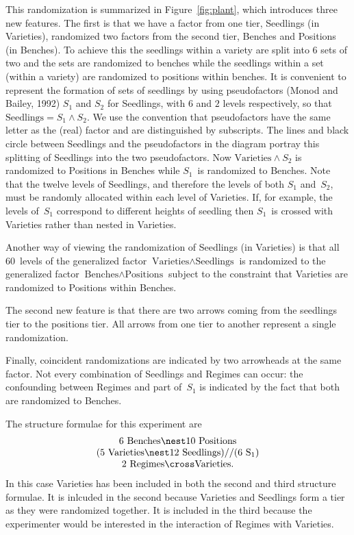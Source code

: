 This randomization is summarized in Figure~\ref{fig:plant}, which 
introduces three new features.  The first is that we have a factor from one 
tier, Seedlings (in Varieties), randomized two factors from the second tier, 
Benches and Positions (in Benches). 
To achieve this the seedlings within a variety are split into 6 sets of
two and the sets are randomized to benches while the seedlings within a set 
(within a variety) are randomized to positions within benches.
It is convenient to represent the formation of sets of seedlings by using
pseudofactors (\nocite{Monod92}Monod and Bailey, 1992) $S_1$ and $S_2$ 
for Seedlings, with $6$ and $2$ levels
respectively, so that $\mbox{Seedlings} = S_1\wedge S_2$. We use the
convention that pseudofactors have the same letter as the (real)
factor and are distinguished by subscripts. The lines and black circle between 
Seedlings and the pseudofactors in the diagram portray this splitting of 
Seedlings into the two pseudofactors. 
Now $\mbox{Varieties}
\wedge S_2$ is randomized to Positions in Benches while $S_1$~is
randomized to Benches. Note that the twelve levels of Seedlings, 
and therefore the levels of
both $S_1$ and~$S_2$, must be randomly allocated within each level of
Varieties. If, for example, the levels of~$S_1$ correspond to
different heights of seedling then $S_1$~is crossed with Varieties
rather than nested in Varieties.

Another way of viewing the randomization of Seedlings (in Varieties) 
is that all $60$~levels of the generalized factor 
$\mbox{Varieties} \wedge \mbox{Seedlings}$ is randomized to 
the generalized factor $\mbox{Benches}\wedge \mbox{Positions}$ subject 
to the constraint that Varieties are randomized to Positions within Benches. 

The second new feature is that there are two arrows coming from the 
seedlings tier to the positions tier. All arrows from one tier to
another represent a single randomization.

Finally, coincident randomizations are indicated by two arrowheads at the
same factor. Not every combination of Seedlings and Regimes can occur:
the confounding between Regimes and part of~$S_1$ is indicated by the
fact that both are randomized to Benches.

The structure formulae for this experiment are
\[\begin{array}{c}
  \mbox{6 Benches} \nest \mbox{10 Positions} \\
  (\mbox{5 Varieties} \nest \mbox{12 Seedlings})//(\mbox{6 S}_1)  \\
  \mbox{2 Regimes} \cross \mbox{Varieties}.
\end{array}\]
In this case Varieties has been included in both the second and third 
structure formulae. 
It is inlcuded in the second because Varieties and 
Seedlings form a tier as they were randomized together. 
It is included in the third because the experimenter 
would be interested in the interaction of Regimes with Varieties.

